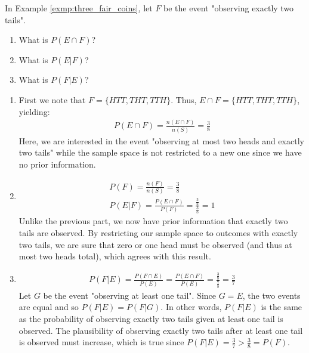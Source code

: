 \begin{exmp}
	In Example \autoref{exmp:three_fair_coins}, let \( F \) be the event "observing exactly two tails".
	\begin{enumerate}
		\item What is \( P(E \cap F) \)?
		\item What is \( P(E | F) \)?
		\item What is \( P(F | E) \)?
	\end{enumerate}
\end{exmp}
\begin{solution}
	\begin{enumerate}
		\item First we note that \( F = \{ HTT, THT, TTH \} \).
		Thus, \( E \cap F = \{ HTT, THT, TTH \} \), yielding:
		\begin{align*}
			P(E \cap F) = \frac{n(E \cap F)}{n(S)} = \frac{3}{8}
		\end{align*}
		Here, we are interested in the event "observing at most two heads and exactly two tails" while the sample space is not restricted to a new one since we have no prior information.
		\item \begin{gather*}
			P(F) = \frac{n(F)}{n(S)} = \frac{3}{8}\\
			P(E | F) = \frac{P(E \cap F)}{P(F)} = \frac{\frac{3}{8}}{\frac{3}{8}} = 1
		\end{gather*}
		Unlike the previous part, we now have prior information that exactly two tails are observed. 
		By restricting our sample space to outcomes with exactly two tails, we are sure that zero or one head must be observed (and thus at most two heads total), which agrees with this result.
		\item \begin{gather*}
			P(F | E) = \frac{P(F \cap E)}{P(E)} = \frac{P(E \cap F)}{P(E)} = \frac{\frac{3}{8}}{\frac{7}{8}} = \frac{3}{7}
		\end{gather*}
		Let \( G \) be the event "observing at least one tail".
		Since \( G = E \), the two events are equal and so \( P(F | E) = P(F | G) \).
		In other words, \( P(F | E) \) is the same as the probability of observing exactly two tails given at least one tail is observed.
		The plausibility of observing exactly two tails after at least one tail is observed must increase,
		which is true since \( P(F | E) = \frac{3}{7} > \frac{3}{8} = P(F) \).
	\end{enumerate}
\end{solution}

